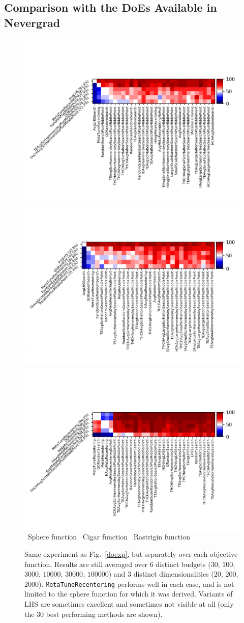 \subsection{Comparison with the DoEs Available in Nevergrad}%
\label{rg}
%
\begin{figure}[t]
    \centering
\includegraphics[trim={30 25 12 80}, clip,width=.32\textwidth]{sections/appendix/ppsn2020-rescaling/figures/fight_namesphere}      \includegraphics[trim={30 25 12 80}, clip,width=.32\textwidth]{sections/appendix/ppsn2020-rescaling/figures/fight_namecigar.png}     
\includegraphics[trim={30 25 12 80}, clip,width=.32\textwidth]{sections/appendix/ppsn2020-rescaling/figures/fight_namerastrigin.png}   \\ 
~\hfill Sphere function\hfill ~ \hfill Cigar function\hfill ~ \hfill Rastrigin function\hfill ~\\
\caption{Same experiment as Fig.~\ref{doexp}, but separately over each objective function. Results are still averaged over 6 distinct budgets ($30$, $100$, $3000$, $10000$, $30000$, $100000$) and 3 distinct dimensionalities ($20$, $200$, $2000$). {\texttt{MetaTuneRecentering} performs well in each case, and is not limited to the sphere function for which it was derived. Variants of LHS are sometimes excellent and sometimes not visible at all (only the 30 best performing methods are shown).}}
    \label{toto3}
\end{figure}
%
